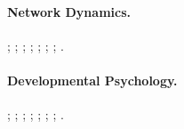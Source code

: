 \documentclass{article}
\theoremstyle{definition}
\begin{document}
\paragraph{Network Dynamics.} \citet{avena2019spectrum}; \citet{steyn2010modeling}; \citet{znaidi2023unified}; \citet{kulkarni2024towards}; \citet{sporns2010networks}; \citet{weber2025geometric}; \citet{topping2022understanding}; \citet{fesser2023mitigating}.

\paragraph{Developmental Psychology.} \citet{sandseter2011children}; \citet{spencer2003play}; \citet{field2001development}; \citet{king1998pathways}; \citet{muris2000development}; \citet{gullone2000developmental}; \citet{muris2002ontogeny}; \citet{gullone2003developmental}.

\clearpage
\end{document}
